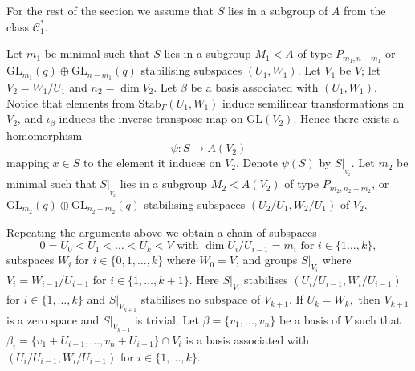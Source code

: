 \documentclass[a4paper,reqno,11pt]{amsart}
\theoremstyle{definition}
\theoremstyle{remark}
\numberwithin{equation}{section}
\newcommand{\GL}{{\mathrm{GL}}}
\begin{document}
For the rest of the section we assume that $S$ lies in a subgroup of $A$ from the class $\mathcal{C}_1^*$.

 Let $m_1$ be minimal such that $S$ lies in a  subgroup $M_1<A$ of type $P_{m_1, n-m_1}$ or $\GL_{m_1}(q) \oplus \GL_{n-m_1}(q)$ stabilising subspaces $(U_1,W_1)$. Let $V_1$ be $V$;  let $V_2=W_1/U_1$ and $n_2=\dim V_2$. Let $\beta$ be a basis associated with $(U_1,W_1).$ Notice that elements from $\mathrm{Stab}_{\Gamma}(U_1,W_1)$ induce semilinear transformations on $V_2$, and $\iota_{\beta}$ induces the inverse-transpose map on $\GL(V_2).$  Hence there exists a homomorphism 
$$\psi: S \to A(V_2) $$ mapping $x \in S$ to the element it induces on $V_2.$ Denote $\psi(S)$ by $S|_{_{V_2}}.$ Let $m_2$ be minimal such that $S|_{_{V_2}}$ lies in a  subgroup $M_2<A(V_2)$ of type $P_{m_2, n_2-m_2}$, or $\GL_{m_2}(q) \oplus \GL_{n_2-m_2}(q)$ stabilising subspaces $(U_2/U_1,W_2/U_1)$ of $V_2$.

 Repeating the arguments above we obtain a chain of subspaces 
\begin{equation}
\label{GRUs}
 0=U_0<U_1< \ldots < U_k<V \text { with } \dim U_i/U_{i-1} =m_i \text{ for } i \in\{1 \ldots, k\},
\end{equation} 
 subspaces $W_i$  for $i \in \{0, 1, \ldots, k\}$ where $W_0=V$, and groups $S|_{V_i}$ where $V_i=W_{i-1}/U_{i-1}$ for $i \in \{1, \ldots, k+1\}.$ Here $S|_{V_{i}}$ stabilises $(U_{i}/U_{i-1}, W_{i}/U_{i-1})$ for $i\in \{1, \ldots, k\}$ and $S|_{V_{k+1}}$ stabilises no subspace of $V_{k+1}.$ If $U_k=W_k,$ then $V_{k+1}$ is a zero space and  $S|_{V_{k+1}}$ is trivial.  Let $\beta=\{v_1, \ldots, v_n\}$ be a basis of $V$ such that  $\beta_i=\{v_1 +U_{i-1}, \ldots, v_n +U_{i-1}\} \cap V_i$ is a basis associated with $(U_{i}/U_{i-1}, W_{i}/U_{i-1})$ for $i\in \{1, \ldots, k\}.$
\end{document}
